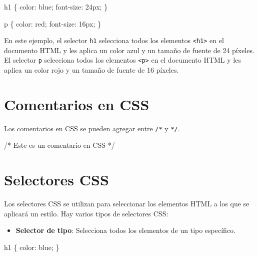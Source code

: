 \documentclass[
  a4paper,
  DIV=11,
  numbers=noendperiod,
  onepage,
  openany]{scrreprt}
\newenvironment{Shaded}{\begin{snugshade}}{\end{snugshade}}
\newcommand{\CommentTok}[1]{\textcolor[rgb]{0.37,0.37,0.37}{#1}}
\newcommand{\ConstantTok}[1]{\textcolor[rgb]{0.56,0.35,0.01}{#1}}
\newcommand{\DataTypeTok}[1]{\textcolor[rgb]{0.68,0.00,0.00}{#1}}
\newcommand{\DecValTok}[1]{\textcolor[rgb]{0.68,0.00,0.00}{#1}}
\newcommand{\KeywordTok}[1]{\textcolor[rgb]{0.00,0.23,0.31}{#1}}
\newcommand{\NormalTok}[1]{\textcolor[rgb]{0.00,0.23,0.31}{#1}}
\newcommand{\OperatorTok}[1]{\textcolor[rgb]{0.37,0.37,0.37}{#1}}
\providecommand{\tightlist}{%
  \setlength{\itemsep}{0pt}\setlength{\parskip}{0pt}}\usepackage{longtable,booktabs,array}
\begin{document}
\begin{Shaded}
\begin{Highlighting}[]
\NormalTok{h1 \{}
  \KeywordTok{color}\NormalTok{: }\ConstantTok{blue}\OperatorTok{;}
  \KeywordTok{font{-}size}\NormalTok{: }\DecValTok{24}\DataTypeTok{px}\OperatorTok{;}
\NormalTok{\}}

\NormalTok{p \{}
  \KeywordTok{color}\NormalTok{: }\ConstantTok{red}\OperatorTok{;}
  \KeywordTok{font{-}size}\NormalTok{: }\DecValTok{16}\DataTypeTok{px}\OperatorTok{;}
\NormalTok{\}}
\end{Highlighting}
\end{Shaded}

En este ejemplo, el selector \texttt{h1} selecciona todos los elementos
\texttt{\textless{}h1\textgreater{}} en el documento HTML y les aplica
un color azul y un tamaño de fuente de 24 píxeles. El selector
\texttt{p} selecciona todos los elementos
\texttt{\textless{}p\textgreater{}} en el documento HTML y les aplica un
color rojo y un tamaño de fuente de 16 píxeles.

\section{Comentarios en CSS}\label{comentarios-en-css}

Los comentarios en CSS se pueden agregar entre \texttt{/*} y
\texttt{*/}.

\begin{Shaded}
\begin{Highlighting}[]
\CommentTok{/* Este es un comentario en CSS */}
\end{Highlighting}
\end{Shaded}

\section{Selectores CSS}\label{selectores-css}

Los selectores CSS se utilizan para seleccionar los elementos HTML a los
que se aplicará un estilo. Hay varios tipos de selectores CSS:

\begin{itemize}
\tightlist
\item
  \textbf{Selector de tipo}: Selecciona todos los elementos de un tipo
  específico.
\end{itemize}

\begin{Shaded}
\begin{Highlighting}[]
\NormalTok{h1 \{}
  \KeywordTok{color}\NormalTok{: }\ConstantTok{blue}\OperatorTok{;}
\NormalTok{\}}
\end{Highlighting}
\end{Shaded}
\end{document}
